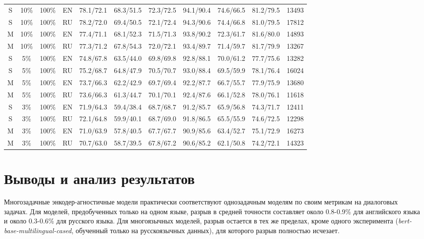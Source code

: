 \begin{table*}
{\begin{tabular}{|c|c|c|c||c|c|c|c|c|c||c|}
 S  &  10\%  &  100\%  &  EN  & 78.1/72.1 & 68.3/51.5 & 72.3/72.5 & 94.1/90.4 & 74.6/66.5 & 81.2/79.5 & 13493 \\ 
 S & 10\% & 100\% & RU & 78.2/72.0 & 69.4/50.5 & 72.1/72.4 & 94.3/90.6 & 74.4/66.8 & 81.0/79.5 & 17812 \\
 M  &  10\%  &  100\%  &  EN  & 77.4/71.1 & 68.1/52.3 & 71.5/71.3 & 93.8/90.2 & 72.3/61.7 & 81.6/80.0 & 14893 \\ 
M & 10\% & 100\% & RU & 77.3/71.2 & 67.8/54.3 & 72.0/72.1 & 93.4/89.7 & 71.4/59.7 & 81.7/79.9 & 13267 \\ \hline
 S  &  5\%  &  100\%  &  EN  & 74.8/67.8 & 63.5/44.0 & 69.8/69.8 & 92.8/88.1 & 70.0/61.2 & 77.7/75.6 & 13282 \\ 
S & 5\% & 100\% & RU & 75.2/68.7 & 64.8/47.9 & 70.5/70.7 & 93.0/88.4 & 69.5/59.9 & 78.1/76.4 & 16024 \\
 M  &  5\%  &  100\%  &  EN  & 73.7/66.3 & 62.2/42.9 & 69.7/69.4 & 92.2/87.7 & 66.7/55.7 & 77.9/75.9 & 13680 \\ 
M & 5\% & 100\% & RU & 73.6/66.3 & 61.3/44.7 & 70.1/70.1 & 92.4/87.6 & 66.1/52.8 & 78.0/76.1 & 11618 \\ \hline
 S  &  3\%  &  100\%  &  EN  & 71.9/64.3 & 59.4/38.4 & 68.7/68.7 & 91.2/85.7 & 65.9/56.8 & 74.3/71.7 & 12411 \\ 
 S & 3\% & 100\% & RU & 72.1/64.8 & 59.9/40.1 & 68.7/69.0 & 91.8/86.5 & 65.5/55.9 & 74.6/72.5 & 12298 \\
 M  &  3\%  &  100\%  &  EN  & 71.0/63.9 & 57.8/40.5 & 67.7/67.7 & 90.9/85.6 & 63.4/52.7 & 75.1/72.9 & 16273 \\ 
M & 3\% & 100\% & RU & 70.7/63.0 & 58.7/39.5 & 67.8/67.2 & 90.6/85.2 & 62.1/50.8 & 74.2/72.1 & 14323 \\ \hline \end{tabular} } \end{table*} 


\section{Выводы и анализ результатов}\label{ch:tr-ag:discussion_conclusion}
Многозадачные энкодер-агностичные модели практически соответствуют однозадачным моделям по своим метрикам на диалоговых задачах. Для моделей, предобученных только на одном языке, разрыв в средней точности составляет около 0.8-0.9\% для английского языка и около 0.3-0.6\% для русского языка. Для многоязычных моделей, разрыв остается в тех же пределах, кроме одного эксперимента (\textit{bert-base-multilingual-cased}, обученный только на русскоязычных данных), для которого разрыв полностью исчезает.


